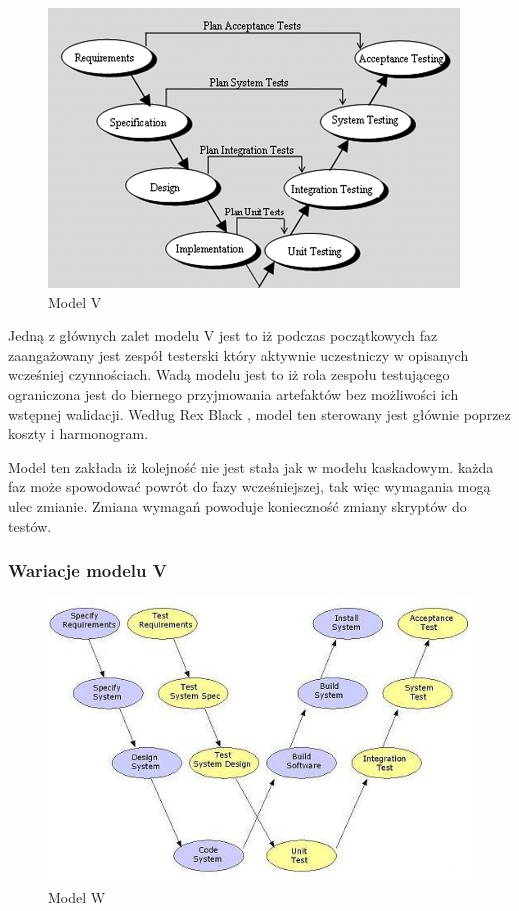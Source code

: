 \begin{figure}[h]
\centerline{\includegraphics[scale=0.7]{img/vmodel.png}}
\caption{Model V \cite{otss}}
\label{fig:vmodel}
\end{figure}

Jedną z głównych zalet modelu V jest to iż podczas początkowych faz zaangażowany jest zespół testerski który aktywnie uczestniczy w opisanych wcześniej czynnościach. Wadą modelu jest to iż rola zespołu testującego ograniczona jest do biernego przyjmowania artefaktów bez możliwości ich wstępnej walidacji.  Według Rex Black \cite{Fund}, model ten sterowany jest głównie poprzez koszty i harmonogram.

Model ten zakłada iż kolejność nie jest stała jak w modelu kaskadowym. każda  faz może spowodować powrót do fazy wcześniejszej, tak więc wymagania mogą ulec zmianie. Zmiana wymagań powoduje konieczność zmiany skryptów do testów.

\subsubsection{Wariacje modelu V}
\begin{figure}[h]
\centerline{\includegraphics[scale=0.5]{img/Wmodel3.JPG}}
\caption{Model W  \cite{wmodel}}
\label{fig:wmodel}
\end{figure}


